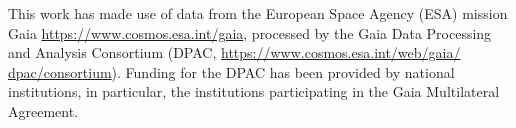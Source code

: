 \documentclass{aastex63}
\begin{document}
This work has made use of data from the European Space Agency (ESA)
mission Gaia \url{https://www.cosmos.esa.int/gaia}, processed by the Gaia
Data Processing and Analysis Consortium (DPAC,
\url{https://www.cosmos.esa.int/web/gaia/ dpac/consortium}). Funding for the
DPAC has been provided by national institutions, in particular, the
institutions participating in the Gaia Multilateral Agreement.
 
\vspace{5mm}

\appendix
%
 
{}

\end{document}

